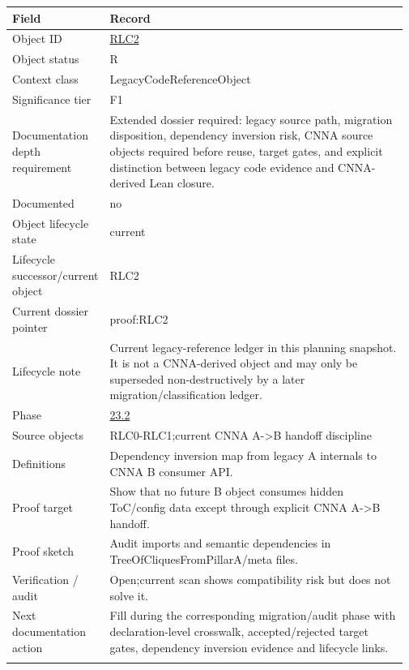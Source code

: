 \begin{longtable}{L{0.16\linewidth} L{0.81\linewidth}}
\hline
\textbf{Field} & \textbf{Record}\\
\hline
Object ID & \hyperlink{object-row-RLC2}{RLC2}\\
\hline\addlinespace[0.20em]
Object status & R\\
\hline\addlinespace[0.20em]
Context class & LegacyCodeReferenceObject\\
\hline\addlinespace[0.20em]
Significance tier & F1\\
\hline\addlinespace[0.20em]
Documentation depth requirement & Extended dossier required: legacy source path, migration disposition, dependency inversion risk, CNNA source objects required before reuse, target gates, and explicit distinction between legacy code evidence and CNNA-derived Lean closure.\\
\hline\addlinespace[0.20em]
Documented & no\\
\hline\addlinespace[0.20em]
Object lifecycle state & current\\
\hline\addlinespace[0.20em]
Lifecycle successor/\allowbreak{}current object & RLC2\\
\hline\addlinespace[0.20em]
Current dossier pointer & proof:RLC2\\
\hline\addlinespace[0.20em]
Lifecycle note & Current legacy-reference ledger in this planning snapshot. It is not a CNNA-derived object and may only be superseded non-destructively by a later migration/\allowbreak{}classification ledger.\\
\hline\addlinespace[0.20em]
Phase & \hyperlink{phase-row-23-2}{23.2}\\
\hline\addlinespace[0.20em]
Source objects & RLC0-RLC1;\newline current CNNA A->B handoff discipline\\
\hline\addlinespace[0.20em]
Definitions & Dependency inversion map from legacy A internals to CNNA B consumer API.\\
\hline\addlinespace[0.20em]
Proof target & Show that no future B object consumes hidden ToC/\allowbreak{}config data except through explicit CNNA A->B handoff.\\
\hline\addlinespace[0.20em]
Proof sketch & Audit imports and semantic dependencies in TreeOfCliquesFromPillarA/\allowbreak{}meta files.\\
\hline\addlinespace[0.20em]
Verification /\allowbreak{} audit & Open;\newline current scan shows compatibility risk but does not solve it.\\
\hline\addlinespace[0.20em]
Next documentation action & Fill during the corresponding migration/\allowbreak{}audit phase with declaration-level crosswalk, accepted/\allowbreak{}rejected target gates, dependency inversion evidence and lifecycle links.\\
\hline\addlinespace[0.20em]
\end{longtable}
